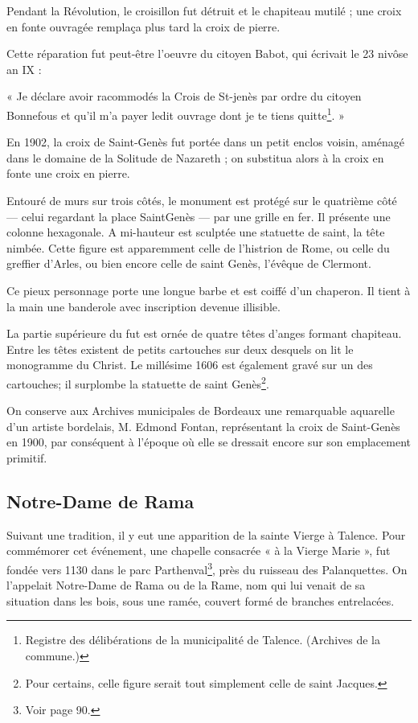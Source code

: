 Pendant la Révolution, le croisillon fut détruit et le chapiteau mutilé ; une croix en fonte ouvragée remplaça plus tard la croix de pierre.

Cette réparation fut peut-être l'oeuvre du citoyen Babot, qui écrivait le 23 nivôse an IX : 

« Je déclare avoir racommodés la Crois de St-jenès par ordre du citoyen Bonnefous et qu'il m'a payer ledit ouvrage dont je te tiens quitte\footnote{Registre des délibérations de la municipalité de Talence. (Archives de la commune.)}. »

En 1902, la croix de Saint-Genès fut portée dans un petit enclos voisin, aménagé dans le domaine de la Solitude de Nazareth ; on substitua alors à la croix en fonte une croix en pierre.

Entouré de murs sur trois côtés, le monument est protégé sur le quatrième côté — celui regardant la place SaintGenès — par une grille en fer. Il présente une colonne hexagonale. A mi-hauteur est sculptée une statuette de saint, la tête nimbée. Cette figure est apparemment celle de l'histrion de Rome, ou celle du greffier d'Arles, ou bien encore celle de saint Genès, l'évêque de Clermont.

Ce pieux personnage porte une longue barbe et est coiffé d'un chaperon. Il tient à la main une banderole avec inscription devenue illisible.

La partie supérieure du fut est ornée de quatre têtes d'anges formant chapiteau. Entre les têtes existent de petits cartouches sur deux desquels on lit le monogramme du Christ. Le millésime 1606 est également gravé sur un des cartouches; il surplombe la statuette de saint Genès\footnote{Pour certains, celle figure serait tout simplement celle de saint Jacques.}.

On conserve aux Archives municipales de Bordeaux une remarquable aquarelle d'un artiste bordelais, M. Edmond Fontan, représentant la croix de Saint-Genès en 1900, par conséquent à l'époque où elle se dressait encore sur son emplacement primitif.

\subsection{Notre-Dame de Rama}

Suivant une tradition, il y eut une apparition de la sainte Vierge à Talence. Pour commémorer cet événement, une chapelle consacrée « à la Vierge Marie », fut fondée vers 1130 dans le parc Parthenval\footnote{Voir page 90.}, près du ruisseau des Palanquettes. On l'appelait Notre-Dame de Rama ou de la Rame, nom qui lui venait de sa situation dans les bois, sous une ramée, couvert formé de branches entrelacées.

